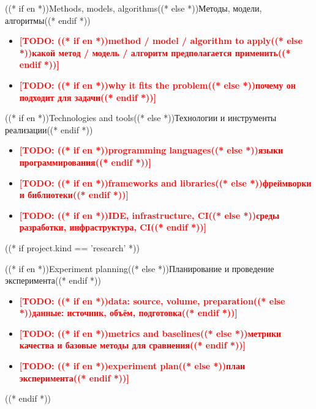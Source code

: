 \documentclass[aspectratio=169, 14pt]{beamer}
\newcommand{\todo}[1]{\textcolor{red}{\textbf{[TODO: #1]}}}
\begin{document}
\begin{frame}{((* if en *))Methods, models, algorithms((* else *))Методы, модели, алгоритмы((* endif *))}
  \begin{itemize}
    \item \todo{((* if en *))method / model / algorithm to apply((* else *))какой метод / модель / алгоритм предполагается применить((* endif *))}
    \item \todo{((* if en *))why it fits the problem((* else *))почему он подходит для задачи((* endif *))}
  \end{itemize}
\end{frame}

\begin{frame}{((* if en *))Technologies and tools((* else *))Технологии и инструменты реализации((* endif *))}
  \begin{itemize}
    \item \todo{((* if en *))programming languages((* else *))языки программирования((* endif *))}
    \item \todo{((* if en *))frameworks and libraries((* else *))фреймворки и библиотеки((* endif *))}
    \item \todo{((* if en *))IDE, infrastructure, CI((* else *))среды разработки, инфраструктура, CI((* endif *))}
  \end{itemize}
\end{frame}

((* if project.kind == 'research' *))
\begin{frame}{((* if en *))Experiment planning((* else *))Планирование и проведение эксперимента((* endif *))}
  \begin{itemize}
    \item \todo{((* if en *))data: source, volume, preparation((* else *))данные: источник, объём, подготовка((* endif *))}
    \item \todo{((* if en *))metrics and baselines((* else *))метрики качества и базовые методы для сравнения((* endif *))}
    \item \todo{((* if en *))experiment plan((* else *))план эксперимента((* endif *))}
  \end{itemize}
\end{frame}
((* endif *))
\end{document}
